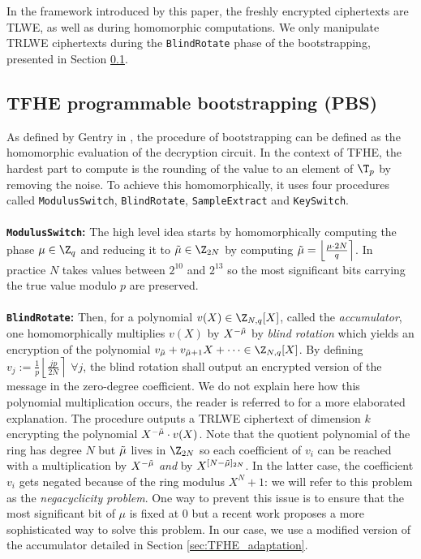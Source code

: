 In the framework introduced by this paper, the freshly encrypted ciphertexts are TLWE, as well as during homomorphic computations. We only manipulate TRLWE ciphertexts during the \texttt{BlindRotate} phase of the bootstrapping, presented in Section \ref{sec:bootstrapping}.

\subsection{TFHE programmable bootstrapping (PBS)}
\label{sec:bootstrapping}

As defined by Gentry in \cite{gentry}, the procedure of bootstrapping can be defined as the homomorphic evaluation of the decryption circuit. In the context of TFHE, the hardest part to compute is the rounding of the value to an element of $\T_p$ by removing the noise. To achieve this homomorphically, it uses four procedures called \texttt{ModulusSwitch}, \texttt{BlindRotate}, \texttt{SampleExtract} and \texttt{KeySwitch}.\\\\


\textbf{\texttt{ModulusSwitch}:} The high level idea starts by homomorphically computing the phase $\mu \in \Z_q$ and reducing it to $\Tilde{\mu} \in \Z_{2N}$ by computing $\Tilde{\mu} = \left \lfloor \frac{\mu \cdot 2N} {q} \right \rceil$. In practice $N$ takes values between $2^{10}$ and $2^{13}$ so the most significant bits carrying the true value modulo $p$ are preserved. \\\\

\textbf{\texttt{BlindRotate}:}  Then, for a polynomial $v(X) \in \Z_{N, q}[X]$, called the \emph{accumulator}, one homomorphically multiplies $v(X)$ by $X^{-\Tilde{\mu}}$ by \emph{blind rotation} which yields an encryption of the polynomial $v_{\Tilde{\mu}} + v_{\Tilde{\mu} + 1} X + \dots \in \Z_{N, q}[X]$. By defining $v_j:= \frac1p {\left \lfloor \frac{jp}{2N} \right \rceil}$ $\forall j$, the blind rotation shall output an encrypted version of the message in the zero-degree coefficient. We do not explain here how this polynomial multiplication occurs, the reader is referred to \cite{cryptoeprint:2018/421} for a more elaborated explanation. The procedure outputs a TRLWE ciphertext of dimension $k$ encrypting the polynomial $X^{-\Tilde{\mu}} \cdot v(X)$. Note that the quotient polynomial of the ring has degree $N$ but $\Tilde{\mu}$ lives in $\Z_{2N}$ so each coefficient of $v_i$ can be reached with a multiplication by $X^{-\Tilde{\mu}}$ \emph{and} by $X^{[N - \Tilde{\mu}]_{2N}}$. In the latter case, the coefficient $v_i$ gets negated because of the ring modulus $X^N + 1$: we will refer to this problem as the \emph{negacyclicity problem}. One way to prevent this issue is to ensure that the most significant bit of $\mu$ is fixed at $0$ \cite{TCHES:Joye22} but a recent work \cite{AC:CLOT21} proposes a more sophisticated way to solve this problem. In our case, we use a modified version of the accumulator detailed in Section \ref{sec:TFHE_adaptation}.
\\\\

